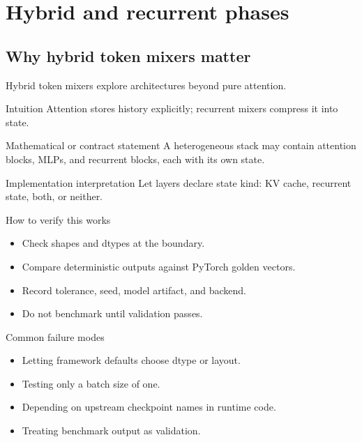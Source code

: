 \part{Hybrid and recurrent phases}

\chapter{Why hybrid token mixers matter}
\label{ch:hybrid-mixers}
Hybrid token mixers explore architectures beyond pure attention.



\begin{intuitionbox}{Intuition}
Attention stores history explicitly; recurrent mixers compress it into state.
\end{intuitionbox}

\begin{definitionbox}{Mathematical or contract statement}
A heterogeneous stack may contain attention blocks, MLPs, and recurrent blocks, each with its own state.
\end{definitionbox}

\begin{implementationbox}{Implementation interpretation}
Let layers declare state kind: KV cache, recurrent state, both, or neither.
\end{implementationbox}

\begin{verificationbox}{How to verify this works}
\begin{itemize}
\item Check shapes and dtypes at the boundary.
\item Compare deterministic outputs against PyTorch golden vectors.
\item Record tolerance, seed, model artifact, and backend.
\item Do not benchmark until validation passes.
\end{itemize}
\end{verificationbox}

\begin{warningbox}{Common failure modes}
\begin{itemize}
\item Letting framework defaults choose dtype or layout.
\item Testing only a batch size of one.
\item Depending on upstream checkpoint names in runtime code.
\item Treating benchmark output as validation.
\end{itemize}
\end{warningbox}

